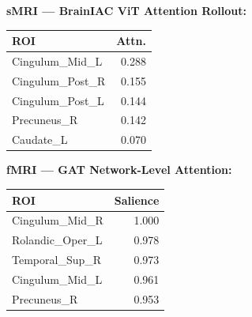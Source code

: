 \documentclass[conference]{IEEEtran}
\begin{document}
\begin{figure}[t]
\begin{tcolorbox}
\vspace{4pt}
\begin{tcolorbox}[enhanced, colframe=gray!50, colback=gray!5,
  title={\small\textbf{(3) Multimodal Neural Evidence}},
  coltitle=black, top=2pt, bottom=2pt, left=3pt, right=3pt, boxrule=0.4pt, arc=2pt]
\small
\begin{minipage}[t]{0.47\textwidth}
\textbf{sMRI — BrainIAC ViT Attention Rollout:}\\[1pt]
\begin{tabular}{@{}lr@{}}
ROI & Attn.\\\hline
Cingulum\_Mid\_L & 0.288\\
Cingulum\_Post\_R & 0.155\\
Cingulum\_Post\_L & 0.144\\
Precuneus\_R & 0.142\\
Caudate\_L & 0.070\\
\end{tabular}
\end{minipage}\hfill\vline\hfill
\begin{minipage}[t]{0.47\textwidth}
\textbf{fMRI — GAT Network-Level Attention:}\\[1pt]
\begin{tabular}{@{}lr@{}}
ROI & Salience\\\hline
Cingulum\_Mid\_R & 1.000\\
Rolandic\_Oper\_L & 0.978\\
Temporal\_Sup\_R & 0.973\\
Cingulum\_Mid\_L & 0.961\\
Precuneus\_R & 0.953\\
\end{tabular}
\end{minipage}
\end{tcolorbox}


\end{tcolorbox}
\end{figure}
\end{document}
